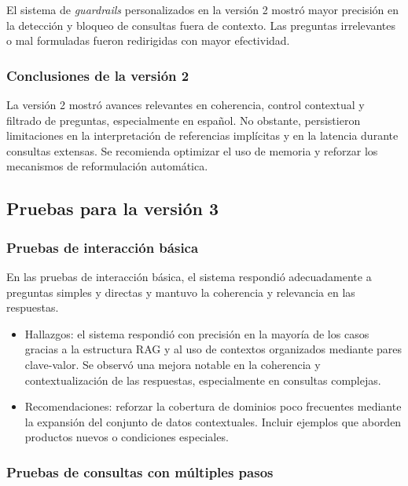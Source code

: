 El sistema de \textit{guardrails} personalizados en la versión 2 mostró mayor precisión en la detección y bloqueo de consultas fuera de contexto. Las preguntas irrelevantes o mal formuladas fueron redirigidas con mayor efectividad.


\subsubsection{Conclusiones de la versión 2}

La versión 2 mostró avances relevantes en coherencia, control contextual y filtrado de preguntas, especialmente en español. No obstante, persistieron limitaciones en la interpretación de referencias implícitas y en la latencia durante consultas extensas. Se recomienda optimizar el uso de memoria y reforzar los mecanismos de reformulación automática.



\subsection{Pruebas para la versión 3}
\label{sec:resultadosPruebasV3}

\subsubsection{Pruebas de interacción básica}

En las pruebas de interacción básica, el sistema respondió adecuadamente a preguntas simples y directas y mantuvo la coherencia y relevancia en las respuestas.

\begin{itemize}
    \item Hallazgos: el sistema respondió con precisión en la mayoría de los casos gracias a la estructura RAG y al uso de contextos organizados mediante pares clave-valor. Se observó una mejora notable en la coherencia y contextualización de las respuestas, especialmente en consultas complejas.
    \item Recomendaciones: reforzar la cobertura de dominios poco frecuentes mediante la expansión del conjunto de datos contextuales. Incluir ejemplos que aborden productos nuevos o condiciones especiales.
\end{itemize}

\subsubsection{Pruebas de consultas con múltiples pasos}

